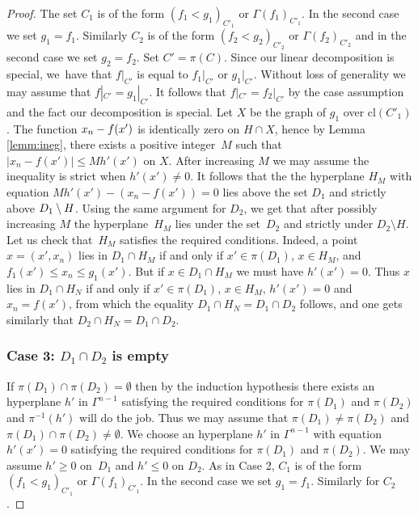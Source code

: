 \documentclass[10pt]{amsart}
\theoremstyle{definition}
\theoremstyle{remark}
\newcommand{\cl}{\mathrm{cl}}
\theoremstyle{plain}
\theoremstyle{definition}
\begin{document}
\begin{proof}
The set $C_1$ is of the form $(f_1 < g_1)_{C'_1}$ or $\Gamma (f_1)_{C'_1}$. In the second case we set $g_1 = f_1$.
Similarly $C_2$ is of the form $(f_2 <g_2)_{C'_2}$ or $\Gamma (f_2)_{C'_2}$ and in the second case we set $g_2 = f_2$.
Set $C' = \pi (C)$.
Since our linear decomposition is special,
we~have that $f|_{C'}$ is equal to $f_1|_{C'}$ or $g_1|_{C'}$. Without loss of generality we may assume that $f|_{C'} = g_1|_{C'}$. It follows that $f|_{C'}=f_2|_{C'}$ by the case assumption and the fact our decomposition is special.
Let $X$ be the graph of $g_1$ over $\cl (C'_1)$. The function $x_n -\nobreak f (x')$ is identically zero on
$H \cap X$, hence by Lemma \ref{lemm:ineg}, there exists a positive integer~$M$ such that
$\vert x_n - f (x') \vert \leq M h' (x')$ on $X$. After increasing $M$ we may assume the inequality is strict when $h' (x') \neq 0$.
It follows that the
the hyperplane $H_M$ with equation \hbox{$Mh'(x') - (x_n - f (x')) = 0$} lies above the set $D_1$
and strictly above $D_1 \setminus\nobreak H$. Using the same argument for $D_2$, we get that after possibly increasing $M$
the hyperplane~$H_M$ lies under the set~$D_2$ and strictly under $D_2 \setminus H$.
Let us check that~$H_M$ satisfies the required conditions.
Indeed, a point $x = (x', x_n)$ lies in $D_1 \cap H_M$ if and only if
$x' \in \pi (D_1)$, $x \in H_M$, and $f_1 (x') \leq x_n \leq g_1 (x')$.
But if $x \in D_1 \cap H_M$ we must have $h'(x') = 0$.
Thus
$x$ lies in $D_1 \cap H_N$ if and only if
$x' \in \pi (D_1)$, $x \in H_M$, $h'(x')= 0$ and $x_n = f(x')$, from which the equality
$D_1 \cap H_N = D_1 \cap D_2$ follows, and one gets similarly that
$D_2 \cap H_N = D_1 \cap D_2$.

\subsubsection*{Case 3: $D_1 \cap D_2$ is empty}

If $\pi (D_1) \cap \pi (D_2) = \emptyset$ then by the induction hypothesis there exists an hyperplane
$h'$ in $\Gamma^{n -1}$ satisfying the required conditions for $\pi (D_1)$ and $\pi (D_2)$ and $\pi^{-1} (h')$ will do the job.
Thus we may assume that $\pi (D_1) \neq \pi (D_2)$ and $\pi (D_1) \cap \pi (D_2) \neq \emptyset$.
We choose an
hyperplane
$h'$ in $\Gamma^{n -1}$ with equation $h'(x')=0$ satisfying the required conditions for $\pi (D_1)$ and $\pi (D_2)$.
We may assume $h' \geq 0$ on~$D_1$ and $h' \leq 0$ on $D_2$.
As in Case 2, $C_1$ is of the form $(f_1 <g_1)_{C'_1}$ or $\Gamma (f_1)_{C'_1}$. In the second case we set $g_1 = f_1$.
Similarly for $C_2$.


\end{proof}
\end{document}
